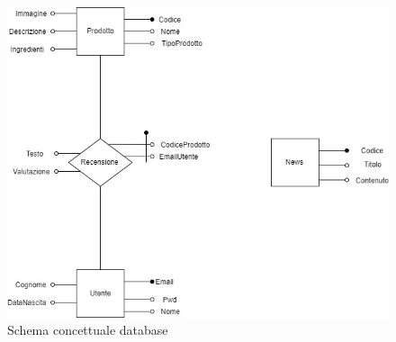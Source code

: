 \begin{figure}[!h]
	\centering
	\includegraphics[width=0.7\linewidth]{sezioni/Progettazione/Immagini/schema_concettuale.jpg}
    \caption{Schema concettuale database}
	\label{Fig:schemadb}
\end{figure}